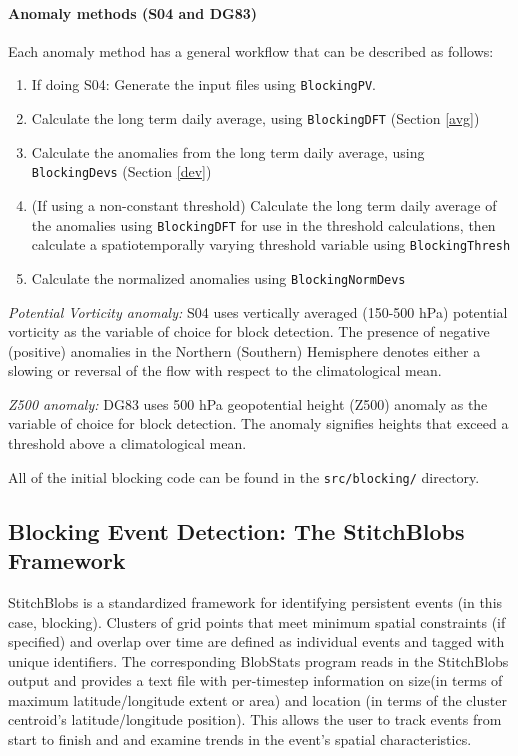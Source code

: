 \documentclass{article}
\begin{document}
\paragraph{Anomaly methods (S04 and DG83)} Each anomaly method has a general workflow that can be described as follows:

\begin{enumerate}
\item If doing S04: Generate the input files using \texttt{BlockingPV}.
\item Calculate the long term daily average, using \texttt{BlockingDFT} (Section \ref{avg})
\item Calculate the anomalies from the long term daily average, using \texttt{BlockingDevs} (Section \ref{dev})
\item (If using a non-constant threshold) Calculate the long term daily average of the anomalies using \texttt{BlockingDFT} for use in the threshold calculations, then calculate a spatiotemporally varying threshold variable using \texttt{BlockingThresh}
\item Calculate the normalized anomalies using \texttt{BlockingNormDevs}
\end{enumerate}


\textit{Potential Vorticity anomaly:} S04 uses vertically averaged (150-500 hPa) potential vorticity as the variable of choice for block detection. The presence of negative (positive) anomalies in the Northern (Southern) Hemisphere denotes either a slowing or reversal of the flow with respect to the climatological mean. 

\textit{Z500 anomaly:} DG83 uses 500 hPa geopotential height (Z500) anomaly as the variable of choice for block detection. The anomaly signifies heights that exceed a threshold above a climatological mean.

All of the initial blocking code can be found in the \texttt{src/blocking/} directory.

\subsection{Blocking Event Detection: The StitchBlobs Framework} 

StitchBlobs is a standardized framework for identifying persistent events (in this case, blocking). Clusters of grid points that meet minimum spatial constraints (if specified) and overlap over time are defined as individual events and tagged with unique identifiers. The corresponding BlobStats program reads in the StitchBlobs output and provides a text file with per-timestep information on size(in terms of maximum latitude/longitude extent or area) and location (in terms of the cluster centroid's latitude/longitude position). This allows the user to track events from start to finish and and examine trends in the event's spatial characteristics.
\end{document}
